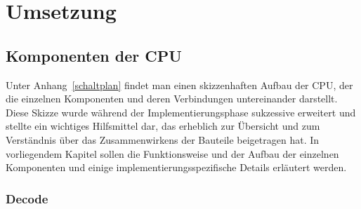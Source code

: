 \iffalse
Herausforderungen:
\TDOD: RAM als RAM erkennen
\TODO: Probleme: ALU und Decode erst clk-sensitiv implementiert
\TODO: latches
\TODO: ELF, 



Sonstiges:
\TODO: links zu Quellcode
\TODO: Block RAM im code umbenennen
\TODO: Komponente Main
\TODO: maschinenbefehle durchgehen: wurde etwas besonders implementiert?
\TODO: warum zwei Takte? => Schreibzugriff RAM, Register...?
\TODO: synchrones design
\TODO: Register erklären?
\TODO: ALU zero-flag-next entfernen
\TODO: Warnings entfernen
\fi

\chapter{Umsetzung} %
\label{Umsetzung} %

\section{Komponenten der CPU}

Unter Anhang~\ref{schaltplan} findet man einen skizzenhaften Aufbau der CPU, der die einzelnen Komponenten und deren Verbindungen untereinander darstellt.
Diese Skizze wurde während der Implementierungsphase sukzessive erweitert und stellte ein wichtiges Hilfsmittel dar, das erheblich zur Übersicht und zum Verständnis über das Zusammenwirkens der Bauteile beigetragen hat.
In vorliegendem Kapitel sollen die Funktionsweise und der Aufbau der einzelnen Komponenten und einige implementierungsspezifische Details erläutert werden.

\subsection{Decode}


